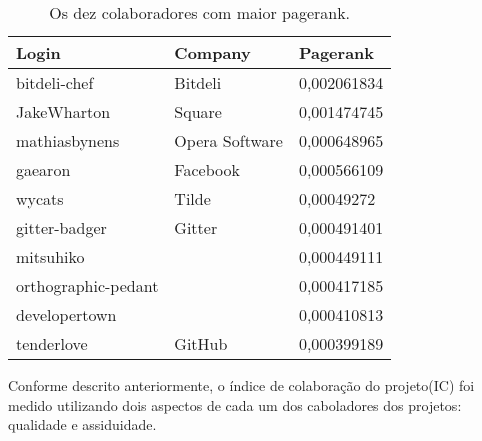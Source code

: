 \begin{table}[H]
\centering
\begin{tabular}{|l|l|l|}
\hline
\textbf{Login}      & \textbf{Company} & \textbf{Pagerank} \\ \hline
bitdeli-chef        & Bitdeli          & 0,002061834       \\ \hline
JakeWharton         & Square           & 0,001474745       \\ \hline
mathiasbynens       & Opera Software   & 0,000648965       \\ \hline
gaearon             & Facebook         & 0,000566109       \\ \hline
wycats              & Tilde            & 0,00049272        \\ \hline
gitter-badger       & Gitter           & 0,000491401       \\ \hline
mitsuhiko           &                  & 0,000449111       \\ \hline
orthographic-pedant &                  & 0,000417185       \\ \hline
developertown       &                  & 0,000410813       \\ \hline
tenderlove          & GitHub           & 0,000399189       \\ \hline
\end{tabular}
\caption{Os dez colaboradores com maior pagerank.}
\label{tab:colaboradores_maior_pagerank}
\end{table}


Conforme descrito anteriormente, o índice de colaboração do projeto(IC) foi medido utilizando dois aspectos de cada um dos caboladores dos projetos: qualidade e assiduidade.


